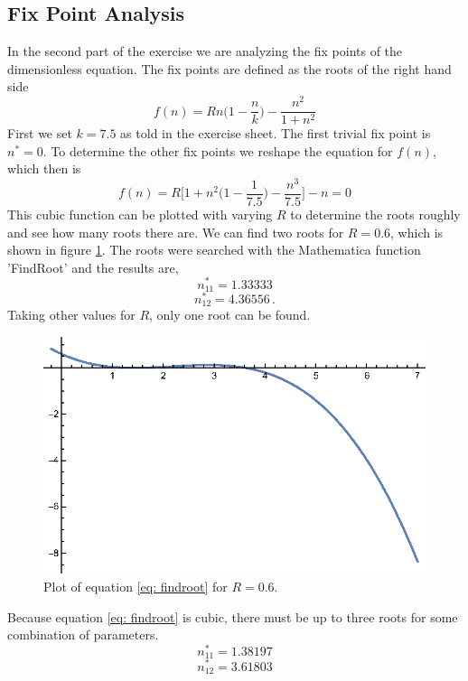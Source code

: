 \documentclass[11pt, a4paper, reqno]{scrartcl}
\begin{document}
	\subsection{Fix Point Analysis}
		 In the second part of the exercise we are analyzing the fix points of the dimensionless equation.
		 The fix points are defined as the roots of the right hand side
		 \[
		 f(n) = R n \bigg(1 - \frac{n}{k} \bigg) - \frac{n^2}{1 + n^2} \]
		 First we set $k = 7.5$ as told in the exercise sheet.
		 The first trivial fix point is $n^{\ast} = 0$.
		 To determine the other fix points we reshape the equation for $f(n)$, which then is
		 \begin{equation}
		 f(n) = R \bigg[1 + n^2 \bigg(1 - \frac{1}{7.5} \bigg) - \frac{n^3}{7.5} \bigg] - n = 0
		 \label{eq: findroot}
		 \end{equation}
		 This cubic function can be plotted with varying $R$ to determine the roots roughly and see how many roots there are.
		 We can find two roots for $R = 0.6$, which is shown in figure \ref{fig: 1}.
		 The roots were searched with the Mathematica function 'FindRoot' and the results are, 
		 \[
		 n^{\ast}_{11} = 1.33333\]
		 \[
		 n^{\ast}_{12} = 4.36556\, .\]
		 Taking other values for $R$, only one root can be found. 
		 \begin{figure}[H]
		 	\centering
		 	\includegraphics[]{CompPhys_6-2_gr1.eps}
		 	\caption{Plot of equation \eqref{eq: findroot} for $R = 0.6$.}
		 	\label{fig: 1}
		 \end{figure}
	 
	 	 Because equation \eqref{eq: findroot} is cubic, there must be up to three roots for some combination of parameters.
	 	 \[n^{\ast}_{11} = 1.38197\]
	 	 \[n^{\ast}_{12} = 3.61803\]
	 	 
\end{document}
